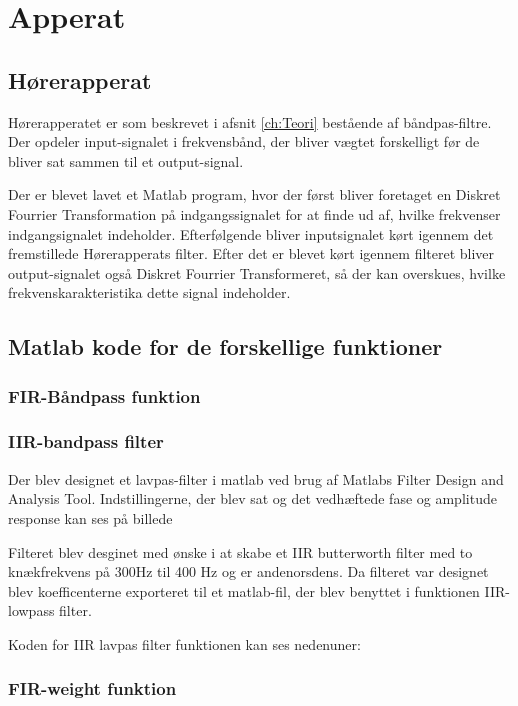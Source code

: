 \chapter{Apperat}\label{ch:Apperat}
\section{Hørerapperat}
Hørerapperatet er som beskrevet i afsnit \ref{ch:Teori} bestående af båndpas-filtre. Der opdeler input-signalet i frekvensbånd, der bliver vægtet forskelligt før de bliver sat sammen til et output-signal.

Der er blevet lavet et Matlab program, hvor der først bliver foretaget en Diskret Fourrier Transformation på indgangssignalet for at finde ud af, hvilke frekvenser indgangsignalet indeholder.
Efterfølgende bliver inputsignalet kørt igennem det fremstillede Hørerapperats filter. Efter det er blevet kørt igennem filteret bliver output-signalet også Diskret Fourrier Transformeret, så der kan overskues, hvilke frekvenskarakteristika dette signal indeholder.
\section{Matlab kode for de forskellige funktioner}
\subsection{FIR-Båndpass funktion}
 
\subsection{IIR-bandpass filter}
Der blev designet et lavpas-filter i matlab ved brug af Matlabs Filter Design and Analysis Tool. Indstillingerne, der blev sat og det vedhæftede fase og amplitude response kan ses på billede 


Filteret blev desginet med ønske i at skabe et IIR butterworth filter med to knækfrekvens på 300Hz til 400 Hz og er andenorsdens. 
Da filteret var designet blev koefficenterne exporteret til et matlab-fil, der blev benyttet i funktionen IIR-lowpass filter.

Koden for IIR lavpas filter funktionen kan ses nedenuner:

\subsection{FIR-weight funktion}

